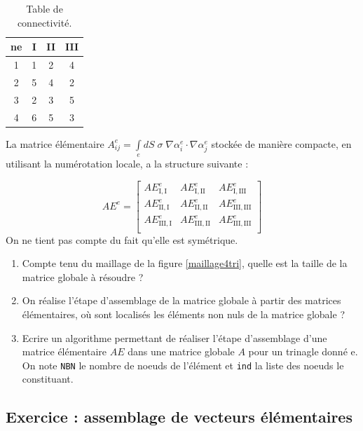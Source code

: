 \documentclass[a4paper, 11pt]{article}
\begin{document}
\begin{table}
    \centering
    \begin{tabular}{|c||c|c|c|}
        \toprule
        ne & I & II & III \\
        \midrule
        1 & 1 & 2 & 4 \\
        2 & 5 & 4 & 2 \\
        3 & 2 & 3 & 5 \\
        4 & 6 & 5 & 3 \\
        \bottomrule
    \end{tabular}
    \caption{Table de connectivité.}
\end{table}

 
 La matrice élémentaire $A_{ij}^e = \int\limits_e {dS\;\sigma \;\nabla \alpha _i^e \cdot \nabla \alpha _j^e} $ 
 stockée de manière compacte, en utilisant la numérotation locale, 
 a la structure suivante :
 
\begin{equation}
 AE^e = 
 \begin{bmatrix}
    AE_\mathrm{I, I}^e & AE_\mathrm{I, II}^e & AE_\mathrm{I, III}^e \\
    AE_\mathrm{II, I}^e & AE_\mathrm{II, II}^e & AE_\mathrm{III, III}^e \\
    AE_\mathrm{III, I}^e & AE_\mathrm{III, II}^e & AE_\mathrm{III, III}^e \\
\end{bmatrix}
\end{equation}
On ne tient pas compte du fait qu'elle est symétrique.
 
\begin{enumerate}
\item Compte tenu du maillage de la figure \ref{maillage4tri}, quelle est la taille de la matrice globale à résoudre ? 
\item On réalise l’étape d’assemblage de la matrice globale à partir des matrices élémentaires, où sont localisés les éléments non nuls de la matrice globale ? 
\item Ecrire un algorithme permettant de réaliser l’étape d’assemblage d'une matrice élémentaire $AE$
dans une matrice globale $A$ pour un trinagle donné e.
On note {\tt NBN} le nombre de noeuds de l'élément et {\tt ind} la liste des noeuds le constituant.
\end{enumerate}


\subsection{Exercice : assemblage de vecteurs élémentaires}
\end{document}
